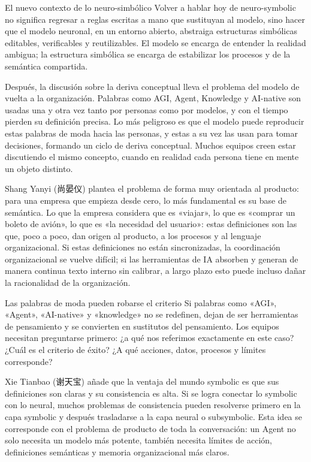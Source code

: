 \documentclass[a4paper]{article}
\begin{document}
\begin{importantbox}{El nuevo contexto de lo neuro-simbólico}
Volver a hablar hoy de neuro-symbolic no significa regresar a reglas escritas a mano que sustituyan al modelo, sino hacer que el modelo neuronal, en un entorno abierto, abstraiga estructuras simbólicas editables, verificables y reutilizables. El modelo se encarga de entender la realidad ambigua; la estructura simbólica se encarga de estabilizar los procesos y de la semántica compartida.
\end{importantbox}

Después, la discusión sobre la deriva conceptual lleva el problema del modelo de vuelta a la organización. Palabras como AGI, Agent, Knowledge y AI-native son usadas una y otra vez tanto por personas como por modelos, y con el tiempo pierden su definición precisa. Lo más peligroso es que el modelo puede reproducir estas palabras de moda hacia las personas, y estas a su vez las usan para tomar decisiones, formando un ciclo de deriva conceptual. Muchos equipos creen estar discutiendo el mismo concepto, cuando en realidad cada persona tiene en mente un objeto distinto.

Shang Yanyi (尚晏仪) plantea el problema de forma muy orientada al producto: para una empresa que empieza desde cero, lo más fundamental es su base de semántica. Lo que la empresa considera que es «viajar», lo que es «comprar un boleto de avión», lo que es «la necesidad del usuario»: estas definiciones son las que, poco a poco, dan origen al producto, a los procesos y al lenguaje organizacional. Si estas definiciones no están sincronizadas, la coordinación organizacional se vuelve difícil; si las herramientas de IA absorben y generan de manera continua texto interno sin calibrar, a largo plazo esto puede incluso dañar la racionalidad de la organización.

\begin{warningbox}{Las palabras de moda pueden robarse el criterio}
Si palabras como «AGI», «Agent», «AI-native» y «knowledge» no se redefinen, dejan de ser herramientas de pensamiento y se convierten en sustitutos del pensamiento. Los equipos necesitan preguntarse primero: ¿a qué nos referimos exactamente en este caso? ¿Cuál es el criterio de éxito? ¿A qué acciones, datos, procesos y límites corresponde?
\end{warningbox}

Xie Tianbao (谢天宝) añade que la ventaja del mundo symbolic es que sus definiciones son claras y su consistencia es alta. Si se logra conectar lo symbolic con lo neural, muchos problemas de consistencia pueden resolverse primero en la capa symbolic y después trasladarse a la capa neural o subsymbolic. Esta idea se corresponde con el problema de producto de toda la conversación: un Agent no solo necesita un modelo más potente, también necesita límites de acción, definiciones semánticas y memoria organizacional más claros.
\end{document}

